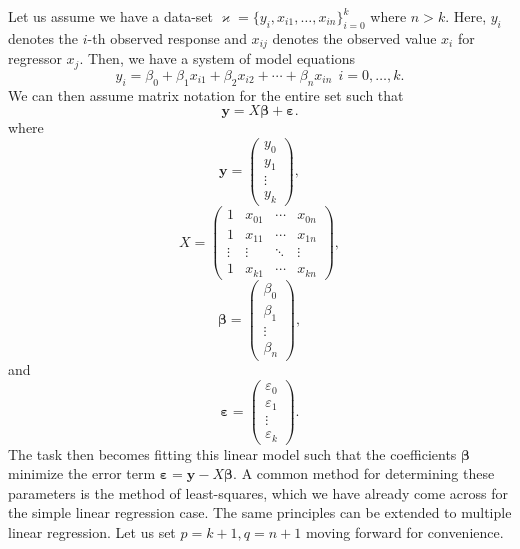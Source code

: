 \documentclass[10pt,a4paper, twocolumn, conference]{IEEEtran}
\theoremstyle{own}
\theoremstyle{definition}
\theoremstyle{plain}
\begin{document}
Let us assume we have a data-set $\varkappa = \{y_i, x_{i1}, \ldots, x_{in} \}_{i=0}^k$ where $n > k$. Here, $y_i$ denotes the $i$-th observed response and $x_{ij}$ denotes the observed value $x_i$ for regressor $x_j$. Then, we have a system of model equations
\begin{equation}
y_i = \beta_0 + \beta_1 x_{i1} + \beta_2 x_{i2} + \cdots + \beta_n x_{in} ~~ i = 0, \ldots, k.
\end{equation}
We can then assume matrix notation for the entire set such that
\begin{equation}
\mathbf{y} = X \boldsymbol\beta + \boldsymbol\varepsilon.
\end{equation}
where
\begin{equation}
\mathbf{y} = \left( \begin{matrix} y_0 \\ y_1 \\ \vdots \\ y_k \end{matrix} \right),
\end{equation}
\begin{equation}
X = \left( \begin{matrix}
1 & x_{01} & \cdots & x_{0n} \\
1 & x_{11} & \cdots & x_{1n} \\
\vdots & \vdots & \ddots & \vdots \\
1 & x_{k1} & \cdots & x_{kn} 
\end{matrix} \right),
\end{equation}
\begin{equation}
\boldsymbol\beta = \left( \begin{matrix} \beta_0 \\ \beta_1 \\ \vdots \\ \beta_n \end{matrix} \right),
\end{equation}
and
\begin{equation}
\boldsymbol\varepsilon = \left( \begin{matrix} \varepsilon_0 \\ \varepsilon_1 \\ \vdots \\ \varepsilon_k \end{matrix} \right).
\end{equation}
The task then becomes fitting this linear model such that the coefficients $\boldsymbol\beta$ minimize the error term $\boldsymbol\varepsilon = \mathbf{y} - X \boldsymbol\beta$. A common method for determining these parameters is the method of least-squares, which we have already come across for the simple linear regression case. The same principles can be extended to multiple linear regression. Let us set $p = k+1, q = n+1$ moving forward for convenience.
\end{document}
